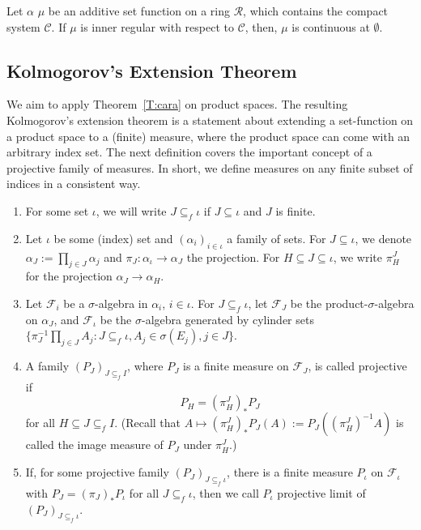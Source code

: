 \documentclass[lean]{Draft}
\begin{document}
\begin{lemma}\label{l:stetigcompact}
  Let $\alpha$ $\mu$ be an additive set function on a ring $\mathcal R$, which contains the compact system $\mathcal C$. If $\mu$ is inner regular with respect to $\mathcal C$, then, $\mu$ is continuous at $\emptyset$.
\end{lemma}

\subsection{Kolmogorov's Extension Theorem}
We aim to apply Theorem~\ref{T:cara} on product spaces. The resulting Kolmogorov's extension theorem is a statement about extending a set-function on a product space to a (finite) measure, where the product space can come with an arbitrary index set.  The next definition covers the important concept of a projective family of measures. In short, we define measures on any finite subset of indices in a consistent way.

\begin{definition} \mbox{}
  \begin{enumerate}
  \item For some set $\iota$, we will write $J\subseteq_f \iota$ if
    $J\subseteq \iota$ and $J$ is finite.
  \item Let $\iota$ be some (index) set and $(\alpha_i)_{i\in\iota}$ a
    family of sets. For $J\subseteq \iota$, we denote $\alpha_J :=
    \prod_{j \in J} \alpha_j$ and $\pi_J : \alpha_\iota \to \alpha_J$
    the projection. For $H\subseteq J \subseteq \iota$, we write
    $\pi_H^J$ for the projection $\alpha_J \to \alpha_H$.
  \item Let $\mathcal F_i$ be a $\sigma$-algebra in $\alpha_i$,
    $i\in\iota$. For $J\subseteq_f \iota$, let $\mathcal F_J$ be the
    product-$\sigma$-algebra on $\alpha_J$, and $\mathcal F_\iota$ be
    the $\sigma$-algebra generated by cylinder sets
    $\{\pi_J^{-1}\prod_{j\in J} A_j: J \subseteq_f \iota, A_j \in
    \sigma(E_j), j\in J\}$.
  \item A family $(P_J)_{J\subseteq_f I}$, where $P_J$ is a finite
    measure on $\mathcal F_J$, is called projective if
    $$P_H = (\pi_H^{J})_\ast P_J$$ for all
    $H\subseteq J \subseteq_f I$. (Recall that $A \mapsto
    (\pi_H^{J})_\ast P_J(A) := P_J((\pi_H^{J})^{-1}A)$
    is called the image measure of $P_J$ under $\pi_H^{J}$.)
  \item If, for some projective family $(P_J)_{J\subseteq_f \iota}$,
    there is a finite measure $P_\iota$ on $\mathcal F_\iota$ with
    $P_J = (\pi_J)_\ast P_\iota$ for all $J\subseteq_f \iota$, then we
    call $P_\iota$ projective limit of $(P_J)_{J\subseteq_f \iota}$.
  \end{enumerate}
\end{definition}
\end{document}
